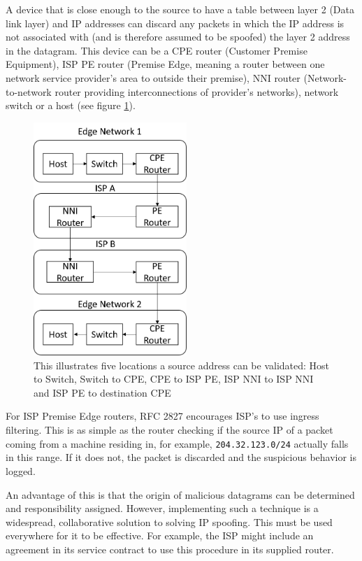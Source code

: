 \documentclass[12pt,twoside]{article}
\begin{document}
A device that is close enough to the source to have a table between layer 2 (Data link layer) and IP addresses can discard any packets in which the IP address is not associated with (and is therefore assumed to be spoofed) the layer 2 address in the datagram. This device can be a CPE router (Customer Premise Equipment), ISP PE router (Premise Edge, meaning a router between one network service provider's area to outside their premise), NNI router (Network-to-network router providing interconnections of provider's networks), network switch or a host (see figure \ref{figure_eliminating}).

\begin{figure}[h]
	\begin{center}
		\includegraphics[width=5.79cm, height=8.82cm]{figures/eliminating2}
	\end{center}
	\caption{This illustrates five locations a source address can be validated: Host to Switch, Switch to CPE, CPE to ISP PE, ISP NNI to ISP NNI and ISP PE to destination CPE}
	\label{figure_eliminating} 
\end{figure}

For ISP Premise Edge routers, RFC 2827 \cite{rfc2827} encourages ISP's to use ingress filtering. This is as simple as the router checking if the source IP of a packet coming from a machine residing in, for example, \texttt{204.32.123.0/24} actually falls in this range. If it does not, the packet is discarded and the suspicious behavior is logged.

An advantage of this is that the origin of malicious datagrams can be determined and responsibility assigned. However, implementing such a technique is a widespread, collaborative solution to solving IP spoofing. This must be used everywhere for it to be effective. For example, the ISP might include an agreement in its service contract to use this procedure in its supplied router.
\end{document}
